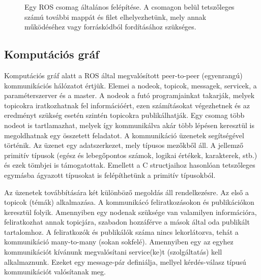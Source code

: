 \begin{figure}
    \centering
    \caption{Egy ROS csomag általános felépítése. A csomagon belül tetszőleges számú további mappát és filet elhelyezhetünk, mely annak működéséhez vagy forráskódból fordításához szükséges.}
    \label{fig:ros_package_structure}
\end{figure}

\subsection{Komputációs gráf}
Komputációs gráf alatt a ROS által megvalósított peer-to-peer (egyenrangú) kommunikációs hálózatot értjük. Elemei a nodeok, topicok, messagek, servicek, a paraméterszerver és a master. A nodeok a futó programjainkat takarják, melyek topicokra iratkozhatnak fel információért, ezen számításokat végezhetnek és az eredményt szükség esetén szintén topicokra publikálhatják. Egy csomag több nodeot is tartlamazhat, melyek így kommunikálva akár több lépésen keresztül is megoldhatnak egy összetett feladatot. A kommunikáció üzenetek segítségével történik. Az üzenet egy adatszerkezet, mely típusos mezőkből áll. A jellemző primitív típusok (egész és lebegőpontos számok, logikai értékek, karakterek, stb.) és ezek tömbjei is támogatottak. Emellett a C structjaihoz hasonlóan tetszőleges egymásba ágyazott típusokat is felépíthetünk a primitív típusokból.

Az üzenetek továbbítására két különböző megoldás áll rendelkezésre. Az első a topicok (témák) alkalmazása. A kommunikácó feliratkozásokon és publikációkon keresztül folyik. Amennyiben egy nodenak szüksége van valamilyen információra, feliratkozhat annak topicjára, szabadon hozzáférve a mások által oda publikált tartalomhoz. A feliratkozók és publikálók száma nincs lekorlátozva, tehát a kommunikáció many-to-many (sokan sokfelé). Amennyiben egy az egyhez kommunikációt kívánunk megvalósítani service(ke)t (szolgáltatás) kell alkalmaznunk. Ezeket egy message-pár definiálja, mellyel kérdés-válasz típusú kommunikációt valósítanak meg.

